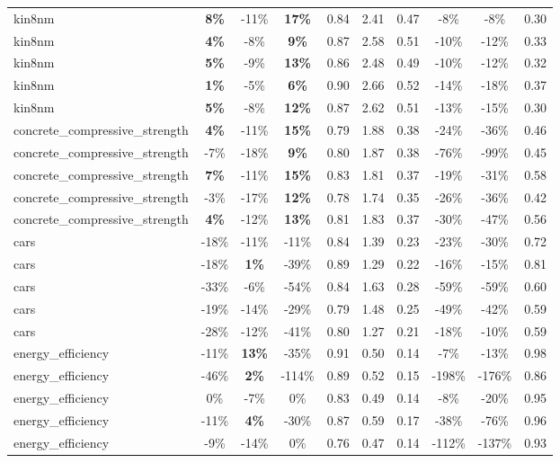 \begin{table}[!htbp]
\begin{small}
\begin{sc}
{\begin{tabular}{lccccccccc}
kin8nm & \textbf{8\%} & -11\% & \textbf{17\%} & 0.84 & 2.41 & 0.47 & -8\% & -8\% & 0.30 \\
kin8nm & \textbf{4\%} & -8\% & \textbf{9\%} & 0.87 & 2.58 & 0.51 & -10\% & -12\% & 0.33 \\
kin8nm & \textbf{5\%} & -9\% & \textbf{13\%} & 0.86 & 2.48 & 0.49 & -10\% & -12\% & 0.32 \\
kin8nm & \textbf{1\%} & -5\% & \textbf{6\%} & 0.90 & 2.66 & 0.52 & -14\% & -18\% & 0.37 \\
kin8nm & \textbf{5\%} & -8\% & \textbf{12\%} & 0.87 & 2.62 & 0.51 & -13\% & -15\% & 0.30 \\
concrete\_compressive\_strength & \textbf{4\%} & -11\% & \textbf{15\%} & 0.79 & 1.88 & 0.38 & -24\% & -36\% & 0.46 \\
concrete\_compressive\_strength & -7\% & -18\% & \textbf{9\%} & 0.80 & 1.87 & 0.38 & -76\% & -99\% & 0.45 \\
concrete\_compressive\_strength & \textbf{7\%} & -11\% & \textbf{15\%} & 0.83 & 1.81 & 0.37 & -19\% & -31\% & 0.58 \\
concrete\_compressive\_strength & -3\% & -17\% & \textbf{12\%} & 0.78 & 1.74 & 0.35 & -26\% & -36\% & 0.42 \\
concrete\_compressive\_strength & \textbf{4\%} & -12\% & \textbf{13\%} & 0.81 & 1.83 & 0.37 & -30\% & -47\% & 0.56 \\
cars & -18\% & -11\% & -11\% & 0.84 & 1.39 & 0.23 & -23\% & -30\% & 0.72 \\
cars & -18\% & \textbf{1\%} & -39\% & 0.89 & 1.29 & 0.22 & -16\% & -15\% & 0.81 \\
cars & -33\% & -6\% & -54\% & 0.84 & 1.63 & 0.28 & -59\% & -59\% & 0.60 \\
cars & -19\% & -14\% & -29\% & 0.79 & 1.48 & 0.25 & -49\% & -42\% & 0.59 \\
cars & -28\% & -12\% & -41\% & 0.80 & 1.27 & 0.21 & -18\% & -10\% & 0.59 \\
energy\_efficiency & -11\% & \textbf{13\%} & -35\% & 0.91 & 0.50 & 0.14 & -7\% & -13\% & 0.98 \\
energy\_efficiency & -46\% & \textbf{2\%} & -114\% & 0.89 & 0.52 & 0.15 & -198\% & -176\% & 0.86 \\
energy\_efficiency & 0\% & -7\% & 0\% & 0.83 & 0.49 & 0.14 & -8\% & -20\% & 0.95 \\
energy\_efficiency & -11\% & \textbf{4\%} & -30\% & 0.87 & 0.59 & 0.17 & -38\% & -76\% & 0.96 \\
energy\_efficiency & -9\% & -14\% & 0\% & 0.76 & 0.47 & 0.14 & -112\% & -137\% & 0.93 \\

\end{tabular}}
\end{sc}
\end{small}
\end{table}
